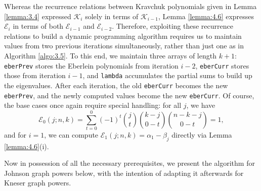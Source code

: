 \documentclass{article}
\def\Ein{\mathcal{E}}
\def\K{\mathcal{K}}
\numberwithin{equation}{section}
\theoremstyle{plain}
\begin{document}
Whereas the recurrence relations between Kravchuk polynomials given in Lemma \ref{lemma:3.4} expressed $\K_i$ solely in terms of $\K_{i - 1}$, Lemma \ref{lemma:4.6} expresses $\Ein_i$ in terms of both $\Ein_{i - 1}$ and $\Ein_{i - 2}$. Therefore, exploiting these recurrence relations to build a dynamic programming algorithm requires us to maintain values from two previous iterations simultaneously, rather than just one as in Algorithm \ref{algo:3.5}. To this end, we maintain three arrays of length $k + 1$: \texttt{eberPrev} stores the Eberlein polynomials from iteration $i - 2$, \texttt{eberCurr} stores those from iteration $i - 1$, and \texttt{lambda} accumulates the partial sums to build up the eigenvalues. After each iteration, the old \texttt{eberCurr} becomes the new \texttt{eberPrev}, and the newly computed values become the new \texttt{eberCurr}. Of course, the base cases once again require special handling: for all $j$, we have
\[\mathcal{E}_0(j; n, k) = \sum_{t = 0}^0 (-1)^t \binom{j}{t} \binom{k - j}{0 - t} \binom{n - k - j}{0 - t} = 1,\]
and for $i = 1$, we can compute $\mathcal{E}_1(j; n, k) = \alpha_1 - \beta_j$ directly via Lemma \ref{lemma:4.6}(i).

Now in possession of all the necessary prerequisites, we present the algorithm for Johnson graph powers below, with the intention of adapting it afterwards for Kneser graph powers.
\end{document}
